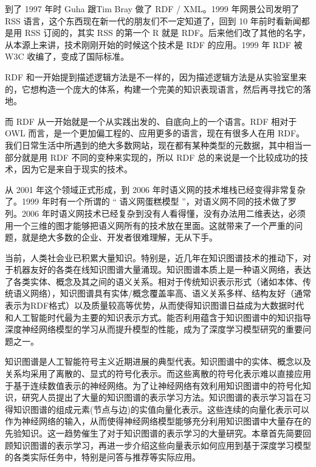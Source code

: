 到了 1997 年时 Guha 跟Tim Bray 做了 RDF / XML。1999 年网景公司发明了 RSS 语言，这个东西现在新一代的朋友们不一定知道了，回到 10 年前时看新闻都是用 RSS 订阅的，其实 RSS 的第一个 R 就是 RDF。后来他们改了其他的名字，从本源上来讲，技术刚刚开始的时候这个技术是 RDF 的应用。1999 年 RDF 被 W3C 收编了，变成了国际标准。


RDF 和一开始提到描述逻辑方法是不一样的，因为描述逻辑方法是从实验室里来的，它想构造一个庞大的体系，构建一个完美的知识表现语言，然后再寻找它的落地。

而 RDF 从一开始就是一个从实践出发的、自底向上的一个语言。RDF 相对于 OWL 而言，是一个更加偏工程的、应用更多的语言，现在有很多人在用 RDF。我们日常生活中所遇到的绝大多数网站，现在都有某种类型的元数据，其中相当一部分就是用 RDF 不同的变种来实现的，所以 RDF 总的来说是一个比较成功的技术，因为它是来自于现实的技术。

从 2001 年这个领域正式形成，到 2006 年时语义网的技术堆栈已经变得非常复杂了。1999 年时有一个所谓的 “ 语义网蛋糕模型 ”，对语义网不同的技术做了罗列。2006 年时语义网技术已经复杂到没有人看得懂，没有办法用二维表达，必须用一个三维的图才能够把语义网所有的技术放在里面。这就带来了一个严重的问题，就是绝大多数的企业、开发者很难理解，无从下手。


当前，人类社会业已积累大量知识。特别是，近几年在知识图谱技术的推动下，对于机器友好的各类在线知识图谱大量涌现。知识图谱本质上是一种语义网络，表达了各类实体、概念及其之间的语义关系。相对于传统知识表示形式（诸如本体、传统语义网络），知识图谱具有实体/概念覆盖率高、语义关系多样、结构友好（通常表示为RDF格式）以及质量较高等优势，从而使得知识图谱日益成为大数据时代和人工智能时代最为主要的知识表示方式。能否利用蕴含于知识图谱中的知识指导深度神经网络模型的学习从而提升模型的性能，成为了深度学习模型研究的重要问题之一。

知识图谱是人工智能符号主义近期进展的典型代表。知识图谱中的实体、概念以及关系均采用了离散的、显式的符号化表示。而这些离散的符号化表示难以直接应用于基于连续数值表示的神经网络。为了让神经网络有效利用知识图谱中的符号化知识，研究人员提出了大量的知识图谱的表示学习方法。知识图谱的表示学习旨在习得知识图谱的组成元素(节点与边)的实值向量化表示。这些连续的向量化表示可以作为神经网络的输入，从而使得神经网络模型能够充分利用知识图谱中大量存在的先验知识。这一趋势催生了对于知识图谱的表示学习的大量研究。本章首先简要回顾知识图谱的表示学习，再进一步介绍这些向量表示如何应用到基于深度学习模型的各类实际任务中，特别是问答与推荐等实际应用。



